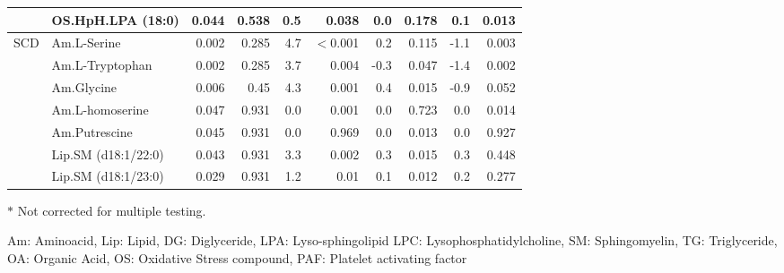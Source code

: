 \documentclass{amsart}
\begin{document}
\begin{table}[H]
\begin{threeparttable}
\begin{tabular}{clrrrrrrrr}
   & OS.HpH.LPA (18:0) & 0.044 & 0.538 & {\cellcolor[rgb]{0.988,0.988,1}}0.5 & 0.038 & {\cellcolor[rgb]{0.984,0.957,0.969}}0.0 & 0.178 & {\cellcolor[rgb]{0.984,0.965,0.976}}0.1 & 0.013 \\ \midrule
  \multirow{7}{*}{SCD} & Am.L-Serine & 0.002 & 0.285 & {\cellcolor[rgb]{0.914,0.961,0.937}}4.7 & $<$0.001 & {\cellcolor[rgb]{0.984,0.973,0.984}}0.2 & 0.115 & {\cellcolor[rgb]{0.98,0.839,0.851}}-1.1 & 0.003 \\
   & Am.L-Tryptophan & 0.002 & 0.285 & {\cellcolor[rgb]{0.929,0.965,0.949}}3.7 & 0.004 & {\cellcolor[rgb]{0.984,0.922,0.933}}-0.3 & 0.047 & {\cellcolor[rgb]{0.98,0.808,0.82}}-1.4 & 0.002 \\
   & Am.Glycine & 0.006 & 0.45 & {\cellcolor[rgb]{0.922,0.961,0.941}}4.3 & 0.001 & {\cellcolor[rgb]{0.988,0.988,1}}0.4 & 0.015 & {\cellcolor[rgb]{0.984,0.859,0.871}}-0.9 & 0.052 \\
   & Am.L-homoserine & 0.047 & 0.931 & {\cellcolor[rgb]{0.984,0.953,0.965}}0.0 & 0.001 & {\cellcolor[rgb]{0.984,0.953,0.965}}0.0 & 0.723 & {\cellcolor[rgb]{0.984,0.953,0.965}}0.0 & 0.014 \\
   & Am.Putrescine & 0.045 & 0.931 & {\cellcolor[rgb]{0.984,0.953,0.965}}0.0 & 0.969 & {\cellcolor[rgb]{0.984,0.953,0.965}}0.0 & 0.013 & {\cellcolor[rgb]{0.984,0.953,0.965}}0.0 & 0.927 \\
   & Lip.SM (d18:1/22:0) & 0.043 & 0.931 & {\cellcolor[rgb]{0.937,0.969,0.957}}3.3 & 0.002 & {\cellcolor[rgb]{0.984,0.984,0.996}}0.3 & 0.015 & {\cellcolor[rgb]{0.984,0.98,0.992}}0.3 & 0.448 \\
   & Lip.SM (d18:1/23:0) & 0.029 & 0.931 & {\cellcolor[rgb]{0.973,0.984,0.988}}1.2 & 0.01 & {\cellcolor[rgb]{0.984,0.969,0.98}}0.1 & 0.012 & {\cellcolor[rgb]{0.984,0.973,0.984}}0.2 & 0.277 \\ \bottomrule
\end{tabular}
\begin{tablenotes}
  \item[$\ast$] Not corrected for multiple testing.
  \item[] Am: Aminoacid, Lip: Lipid, DG: Diglyceride, LPA: Lyso-sphingolipid LPC: Lysophosphatidylcholine, SM: Sphingomyelin, TG: Triglyceride, OA: Organic Acid, OS: Oxidative Stress compound, PAF: Platelet activating factor
\end{tablenotes}
\end{threeparttable}
\end{table}
\newpage
\end{document}
